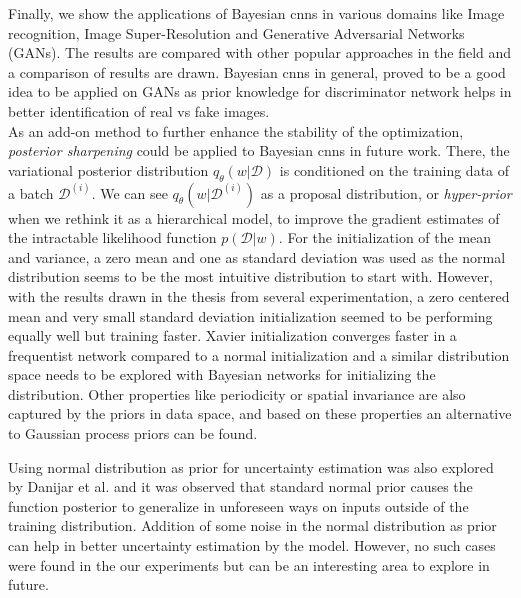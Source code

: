 \newline Finally, we show the applications of Bayesian \acp{cnn} in various domains like Image recognition, Image Super-Resolution and Generative Adversarial Networks (GANs). The results are compared with other popular approaches in the field and a comparison of results are drawn. Bayesian \acp{cnn} in general, proved to be a good idea to be applied on GANs as prior knowledge for discriminator network helps in better identification of real vs fake images. \\


As an add-on method to further enhance the stability of the optimization, \textit{posterior sharpening} \cite{fortunato2017bayesian} could be applied to Bayesian \acp{cnn} in future work. There, the variational posterior distribution $q_{\theta}(w|\mathcal{D})$ is conditioned on the training data of a batch $\mathcal{D}^{(i)}$. We can see $q_{\theta}(w|\mathcal{D}^{(i)})$ as a proposal distribution, or \textit{hyper-prior} when we rethink it as a hierarchical model, to improve the gradient estimates of the intractable likelihood function $p(\mathcal{D}|w)$. For the initialization of the mean and variance, a zero mean and one as standard deviation was used as the normal distribution seems to be the most intuitive distribution to start with. However, with the results drawn in the thesis from several experimentation, a zero centered mean and very small standard deviation initialization seemed to be performing equally well but training faster. Xavier initialization \cite{glorot2010understanding} converges faster in a frequentist network compared to a normal initialization and a similar distribution space needs to be explored with Bayesian networks for initializing the distribution. Other properties like periodicity or spatial invariance are also captured by the priors in data space, and based on these properties an alternative to Gaussian process priors can be found. 

\newline Using normal distribution as prior for uncertainty estimation was also explored by Danijar et al. \cite{hafner2018reliable} and it was observed that standard normal prior causes the function posterior to generalize in unforeseen ways on inputs outside of the training distribution. Addition of some noise in the normal distribution as prior can help in better uncertainty estimation by the model. However, no such cases were found in the our experiments but can be an interesting area to explore in future. 



